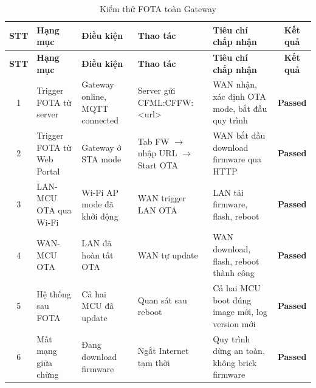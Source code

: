         \begin{longtable}{|c|p{2cm}|p{2.5cm}|p{3.5cm}|p{4cm}|c|}
            \caption{Kiểm thử FOTA toàn Gateway}
            \label{tab:test_fota_gateway} \\
            \hline
            \textbf{STT} & \textbf{Hạng mục} & \textbf{Điều kiện} & \textbf{Thao tác} & \textbf{Tiêu chí chấp nhận} & \textbf{Kết quả} \\ \hline
            \endfirsthead
            \hline
            \textbf{STT} & \textbf{Hạng mục} & \textbf{Điều kiện} & \textbf{Thao tác} & \textbf{Tiêu chí chấp nhận} & \textbf{Kết quả} \\ \hline
            \endhead
            \hline
            \endfoot
            \endlastfoot
        
            1 & Trigger FOTA từ server & Gateway online, MQTT connected & Server gửi CFML:CFFW:\newline<url> & WAN nhận, xác định OTA mode, bắt đầu quy trình & \textcolor{modern_blue}{\textbf{Passed}} \\ \hline
            2 & Trigger FOTA từ Web Portal & Gateway ở STA mode & Tab FW $\rightarrow$ nhập URL $\rightarrow$ Start OTA & WAN bắt đầu download firmware qua HTTP & \textcolor{modern_blue}{\textbf{Passed}} \\ \hline
            3 & LAN-MCU OTA qua Wi-Fi & Wi-Fi AP mode đã khởi động & WAN trigger LAN OTA & LAN tải firmware, flash, reboot & \textcolor{modern_blue}{\textbf{Passed}} \\ \hline
            4 & WAN-MCU OTA & LAN đã hoàn tất OTA & WAN tự update & WAN download, flash, reboot thành công & \textcolor{modern_blue}{\textbf{Passed}} \\ \hline
            5 & Hệ thống sau FOTA & Cả hai MCU đã update & Quan sát sau reboot & Cả hai MCU boot đúng image mới, log version mới & \textcolor{modern_blue}{\textbf{Passed}} \\ \hline
            6 & Mất mạng giữa chừng & Đang download firmware & Ngắt Internet tạm thời & Quy trình dừng an toàn, không brick firmware & \textcolor{modern_blue}{\textbf{Passed}} \\ \hline
        \end{longtable}
        
